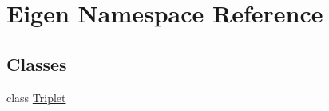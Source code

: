 \hypertarget{namespace_eigen}{\section{Eigen Namespace Reference}
\label{namespace_eigen}
}
\subsection*{Classes}
\begin{DoxyCompactItemize}
\item 
class \hyperlink{class_eigen_1_1_triplet}{Triplet}
\end{DoxyCompactItemize}
